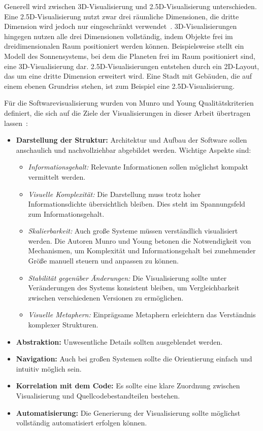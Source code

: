 Generell wird zwischen 3D-Visualisierung und 2{.}5D-Visualisierung unterschieden. Eine 2{.}5D-Visualisierung nutzt zwar drei räumliche Dimensionen, die dritte Dimension wird jedoch nur eingeschränkt verwendet~\cite{wikipedia25D}. 3D-Visualisierungen hingegen nutzen alle drei Dimensionen vollständig, indem Objekte frei im dreidimensionalen Raum positioniert werden können. Beispielsweise stellt ein Modell des Sonnensystems, bei dem die Planeten frei im Raum positioniert sind, eine 3D-Visualisierung dar. 2{.}5D-Visualisierungen entstehen durch ein 2D-Layout, das um eine dritte Dimension erweitert wird. Eine Stadt mit Gebäuden, die auf einem ebenen Grundriss stehen, ist zum Beispiel eine 2{.}5D-Visualisierung.

Für die Softwarevisualisierung wurden von Munro und Young Qualitätskriterien definiert, die sich auf die Ziele der Visualisierungen in dieser Arbeit übertragen lassen~\cite{visSoftwareVR}:
\begin{itemize}
    \item \textbf{Darstellung der Struktur:} Architektur und Aufbau der Software sollen anschaulich und nachvollziehbar abgebildet werden. Wichtige Aspekte sind:
    \begin{itemize}
        \item \emph{Informationsgehalt:} Relevante Informationen sollen möglichst kompakt vermittelt werden.
        \item \emph{Visuelle Komplexität:} Die Darstellung muss trotz hoher Informationsdichte übersichtlich bleiben. Dies steht im Spannungsfeld zum Informationsgehalt.
        \item \emph{Skalierbarkeit:} Auch große Systeme müssen verständlich visualisiert werden. Die Autoren Munro und Young betonen die Notwendigkeit von Mechanismen, um Komplexität und Informationsgehalt bei zunehmender Größe manuell steuern und anpassen zu können.
        \item \emph{Stabilität gegenüber Änderungen:} Die Visualisierung sollte unter Veränderungen des Systems konsistent bleiben, um Vergleichbarkeit zwischen verschiedenen Versionen zu ermöglichen.
        \item \emph{Visuelle Metaphern:} Einprägsame Metaphern erleichtern das Verständnis komplexer Strukturen.
    \end{itemize}
    \item \textbf{Abstraktion:} Unwesentliche Details sollten ausgeblendet werden.
    \item \textbf{Navigation:} Auch bei großen Systemen sollte die Orientierung einfach und intuitiv möglich sein.
    \item \textbf{Korrelation mit dem Code:} Es sollte eine klare Zuordnung zwischen Visualisierung und Quellcodebestandteilen bestehen.
    \item \textbf{Automatisierung:} Die Generierung der Visualisierung sollte möglichst vollständig automatisiert erfolgen können.
\end{itemize}


